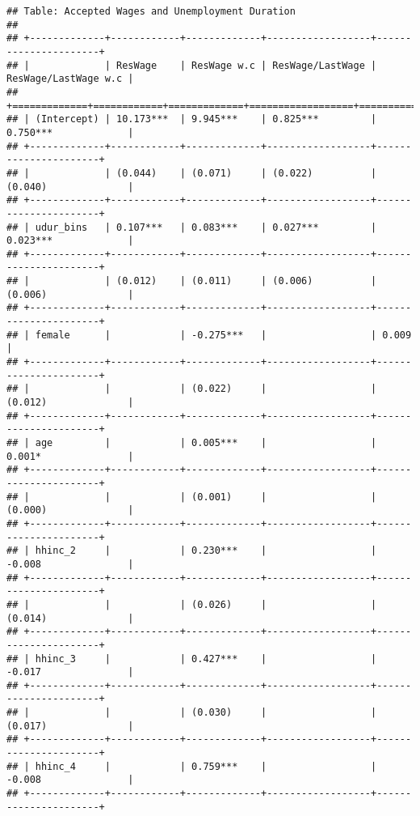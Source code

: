\begin{verbatim}
## Table: Accepted Wages and Unemployment Duration 
## 
## +-------------+------------+-------------+------------------+----------------------+
## |             | ResWage    | ResWage w.c | ResWage/LastWage | ResWage/LastWage w.c |
## +=============+============+=============+==================+======================+
## | (Intercept) | 10.173***  | 9.945***    | 0.825***         | 0.750***             |
## +-------------+------------+-------------+------------------+----------------------+
## |             | (0.044)    | (0.071)     | (0.022)          | (0.040)              |
## +-------------+------------+-------------+------------------+----------------------+
## | udur_bins   | 0.107***   | 0.083***    | 0.027***         | 0.023***             |
## +-------------+------------+-------------+------------------+----------------------+
## |             | (0.012)    | (0.011)     | (0.006)          | (0.006)              |
## +-------------+------------+-------------+------------------+----------------------+
## | female      |            | -0.275***   |                  | 0.009                |
## +-------------+------------+-------------+------------------+----------------------+
## |             |            | (0.022)     |                  | (0.012)              |
## +-------------+------------+-------------+------------------+----------------------+
## | age         |            | 0.005***    |                  | 0.001*               |
## +-------------+------------+-------------+------------------+----------------------+
## |             |            | (0.001)     |                  | (0.000)              |
## +-------------+------------+-------------+------------------+----------------------+
## | hhinc_2     |            | 0.230***    |                  | -0.008               |
## +-------------+------------+-------------+------------------+----------------------+
## |             |            | (0.026)     |                  | (0.014)              |
## +-------------+------------+-------------+------------------+----------------------+
## | hhinc_3     |            | 0.427***    |                  | -0.017               |
## +-------------+------------+-------------+------------------+----------------------+
## |             |            | (0.030)     |                  | (0.017)              |
## +-------------+------------+-------------+------------------+----------------------+
## | hhinc_4     |            | 0.759***    |                  | -0.008               |
## +-------------+------------+-------------+------------------+----------------------+

\end{verbatim}

